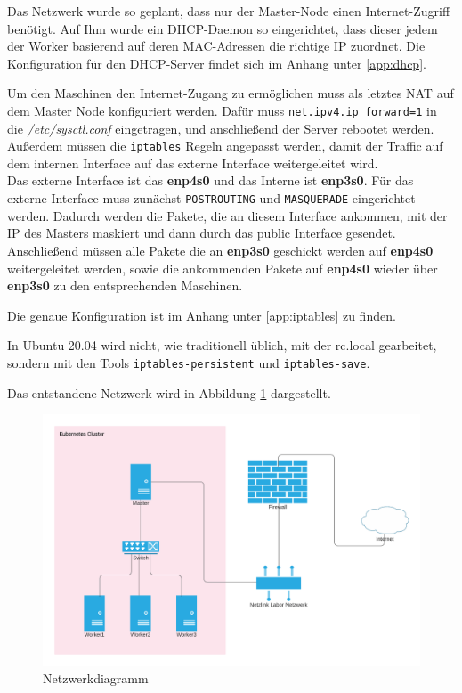 Das Netzwerk wurde so geplant, dass nur der Master-Node einen Internet-Zugriff benötigt.
Auf Ihm wurde ein \ac{DHCP}-Daemon so eingerichtet, dass dieser jedem der Worker basierend auf deren \ac{MAC}-Adressen die richtige IP zuordnet. 
Die Konfiguration für den \ac{DHCP}-Server findet sich im Anhang unter \ref{app:dhcp}. 

Um den Maschinen den Internet-Zugang zu ermöglichen muss als letztes \ac{NAT} auf dem Master Node konfiguriert werden.
Dafür muss \texttt{net.ipv4.ip\_forward=1} in die \textit{/etc/sysctl.conf} eingetragen, und anschließend der Server rebootet werden.
Außerdem müssen die \texttt{iptables} Regeln angepasst werden, damit der Traffic auf dem internen Interface auf das externe Interface weitergeleitet wird. \\
Das externe Interface ist das \textbf{enp4s0} und das Interne ist \textbf{enp3s0}.
Für das externe Interface muss zunächst \texttt{POSTROUTING} und \texttt{MASQUERADE} eingerichtet werden. 
Dadurch werden die Pakete, die an diesem Interface ankommen, mit der IP des Masters maskiert und dann durch das public Interface gesendet. 
\\
Anschließend müssen alle Pakete die an \textbf{enp3s0} geschickt werden auf \textbf{enp4s0} weitergeleitet werden, sowie die ankommenden Pakete auf \textbf{enp4s0} wieder über \textbf{enp3s0} zu den entsprechenden Maschinen.

Die genaue Konfiguration ist im Anhang unter \ref{app:iptables} zu finden. 

In Ubuntu 20.04 wird nicht, wie traditionell üblich, mit der rc.local gearbeitet, sondern mit den Tools \texttt{iptables-persistent} und \texttt{iptables-save}.

Das entstandene Netzwerk wird in Abbildung \ref{fig:network_diagramm} dargestellt.

\begin{figure}[h]
    \centering
    \includegraphics[width=\textwidth]{bilder/Katanetes Network.png}
    \caption{Netzwerkdiagramm}
    \label{fig:network_diagramm}
\end{figure}

